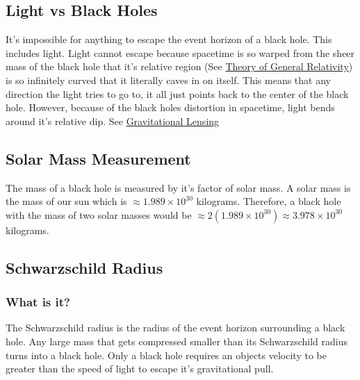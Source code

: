 \documentclass{article}
\begin{document}
\subsection{Light vs Black Holes}
It's impossible for anything to escape the event horizon of a black hole. This includes light. Light cannot escape because spacetime is so warped from the sheer mass of the black hole that it's relative region (See \hyperref[sec:generalrelativity]{Theory of General Relativity}) is so infinitely curved that it literally caves in on itself. This means that any direction the light tries to go to, it all just points back to the center of the black hole.
However, because of the black holes distortion in spacetime, light bends around it's relative dip. See \hyperref[sec:gravitational_lensing]{Gravitational Lensing}

\subsection{Solar Mass Measurement}
The mass of a black hole is measured by it's factor of solar mass. A solar mass is the mass of our sun which is \hyperref[constants]{$\approx 1.989 \times 10^{30}$} kilograms. Therefore, a black hole with the mass of two solar masses would be $\approx 2(1.989 \times 10^{30}) \approx 3.978 \times 10^{30}$ kilograms.

\subsection{Schwarzschild Radius}
\subsubsection{What is it?}
The Schwarzschild radius is the radius of the event horizon surrounding a black hole. Any large mass that gets compressed smaller than its Schwarzschild radius turns into a black hole. Only a black hole requires an objects velocity to be greater than the speed of light to escape it's gravitational pull.
\end{document}
